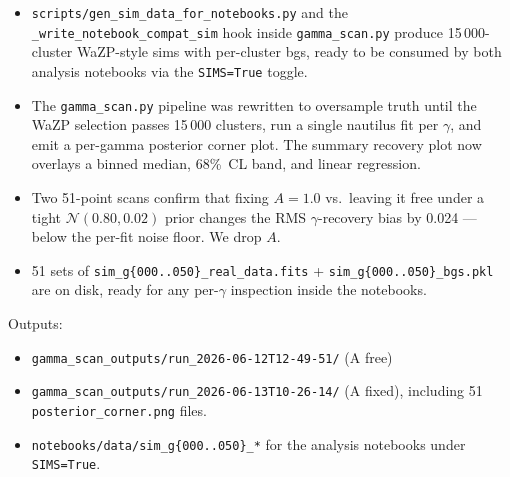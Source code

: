 \documentclass[11pt,a4paper]{article}
\begin{document}
\begin{itemize}
\item \verb|scripts/gen_sim_data_for_notebooks.py| and the
      \verb|_write_notebook_compat_sim| hook inside
      \verb|gamma_scan.py| produce 15\,000-cluster WaZP-style sims with
      per-cluster bgs, ready to be consumed by both analysis notebooks
      via the \verb|SIMS=True| toggle.
\item The \verb|gamma_scan.py| pipeline was rewritten to oversample
      truth until the WaZP selection passes 15\,000 clusters, run a
      single nautilus fit per $\gamma$, and emit a per-gamma posterior
      corner plot. The summary recovery plot now overlays a binned
      median, 68\%~CL band, and linear regression.
\item Two 51-point scans confirm that fixing $A = 1.0$ vs.\ leaving it
      free under a tight $\mathcal{N}(0.80, 0.02)$ prior changes the
      RMS $\gamma$-recovery bias by 0.024 --- below the per-fit noise
      floor. We drop $A$.
\item 51 sets of \verb|sim_g{000..050}_real_data.fits| +
      \verb|sim_g{000..050}_bgs.pkl| are on disk, ready for any
      per-$\gamma$ inspection inside the notebooks.
\end{itemize}

\noindent Outputs:
\begin{itemize}
\item \verb|gamma_scan_outputs/run_2026-06-12T12-49-51/| (A free)
\item \verb|gamma_scan_outputs/run_2026-06-13T10-26-14/| (A fixed),
      including 51 \verb|posterior_corner.png| files.
\item \verb|notebooks/data/sim_g{000..050}_*| for the analysis
      notebooks under \verb|SIMS=True|.
\end{itemize}
\end{document}
